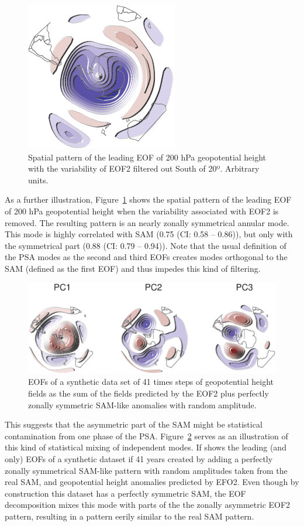 \documentclass[smallextended]{svjour3}       %
\begin{document}
\begin{figure}
\centering
\includegraphics{../figures/eof-filtered-1.pdf}
\caption{\label{fig:eof-filtered}Spatial pattern of the leading EOF of 200 hPa geopotential height with the variability of EOF2 filtered out South of 20º. Arbitrary units.}
\end{figure}

As a further illustration, Figure~\ref{fig:eof-filtered} shows the spatial pattern of the leading EOF of 200 hPa geopotential height when the variability associated with EOF2 is removed. The resulting pattern is an nearly zonally symmetrical annular mode. This mode is highly correlated with SAM (0.75 (CI: 0.58 -- 0.86)), but only with the symmetrical part (0.88 (CI: 0.79 -- 0.94)). Note that the usual definition of the PSA modes as the second and third EOFs creates modes orthogonal to the SAM (defined as the first EOF) and thus impedes this kind of filtering.



\begin{figure}
\centering
\includegraphics{../figures/fake-eof-1.pdf}
\caption{\label{fig:fake-eof}EOFs of a synthetic data set of 41 times steps of geopotential height fields as the sum of the fields predicted by the EOF2 plus perfectly zonally symmetric SAM-like anomalies with random amplitude.}
\end{figure}

This suggests that the asymmetric part of the SAM might be statistical contamination from one phase of the PSA. Figure~\ref{fig:fake-eof} serves as an illustration of this kind of statistical mixing of independent modes. If shows the leading (and only) EOFs of a synthetic dataset if 41 years created by adding a perfectly zonally symmetrical SAM-like pattern with random amplitudes taken from the real SAM, and geopotential height anomalies predicted by EFO2. Even though by construction this dataset has a perfectly symmetric SAM, the EOF decomposition mixes this mode with parts of the the zonally asymmetric EOF2 pattern, resulting in a pattern eerily similar to the real SAM pattern.
\end{document}
